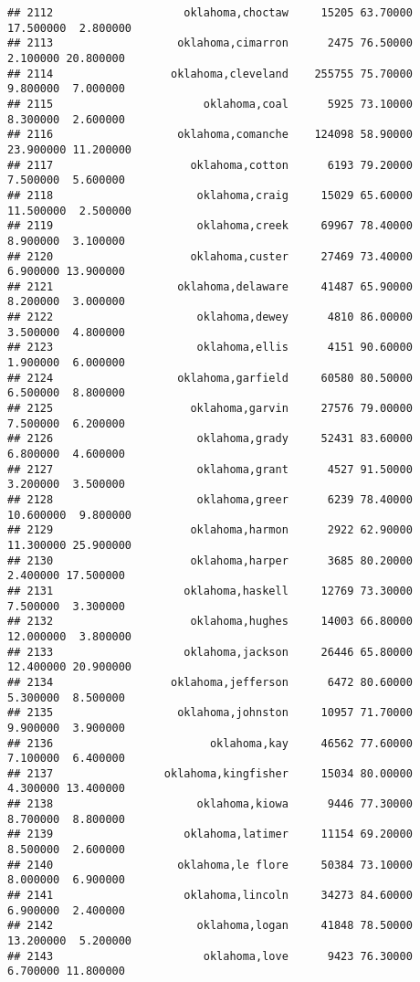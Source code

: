 \documentclass[
]{article}
\begin{document}
\begin{verbatim}
## 2112                    oklahoma,choctaw     15205 63.70000 17.500000  2.800000
## 2113                   oklahoma,cimarron      2475 76.50000  2.100000 20.800000
## 2114                  oklahoma,cleveland    255755 75.70000  9.800000  7.000000
## 2115                       oklahoma,coal      5925 73.10000  8.300000  2.600000
## 2116                   oklahoma,comanche    124098 58.90000 23.900000 11.200000
## 2117                     oklahoma,cotton      6193 79.20000  7.500000  5.600000
## 2118                      oklahoma,craig     15029 65.60000 11.500000  2.500000
## 2119                      oklahoma,creek     69967 78.40000  8.900000  3.100000
## 2120                     oklahoma,custer     27469 73.40000  6.900000 13.900000
## 2121                   oklahoma,delaware     41487 65.90000  8.200000  3.000000
## 2122                      oklahoma,dewey      4810 86.00000  3.500000  4.800000
## 2123                      oklahoma,ellis      4151 90.60000  1.900000  6.000000
## 2124                   oklahoma,garfield     60580 80.50000  6.500000  8.800000
## 2125                     oklahoma,garvin     27576 79.00000  7.500000  6.200000
## 2126                      oklahoma,grady     52431 83.60000  6.800000  4.600000
## 2127                      oklahoma,grant      4527 91.50000  3.200000  3.500000
## 2128                      oklahoma,greer      6239 78.40000 10.600000  9.800000
## 2129                     oklahoma,harmon      2922 62.90000 11.300000 25.900000
## 2130                     oklahoma,harper      3685 80.20000  2.400000 17.500000
## 2131                    oklahoma,haskell     12769 73.30000  7.500000  3.300000
## 2132                     oklahoma,hughes     14003 66.80000 12.000000  3.800000
## 2133                    oklahoma,jackson     26446 65.80000 12.400000 20.900000
## 2134                  oklahoma,jefferson      6472 80.60000  5.300000  8.500000
## 2135                   oklahoma,johnston     10957 71.70000  9.900000  3.900000
## 2136                        oklahoma,kay     46562 77.60000  7.100000  6.400000
## 2137                 oklahoma,kingfisher     15034 80.00000  4.300000 13.400000
## 2138                      oklahoma,kiowa      9446 77.30000  8.700000  8.800000
## 2139                    oklahoma,latimer     11154 69.20000  8.500000  2.600000
## 2140                   oklahoma,le flore     50384 73.10000  8.000000  6.900000
## 2141                    oklahoma,lincoln     34273 84.60000  6.900000  2.400000
## 2142                      oklahoma,logan     41848 78.50000 13.200000  5.200000
## 2143                       oklahoma,love      9423 76.30000  6.700000 11.800000

\end{verbatim}
\end{document}
